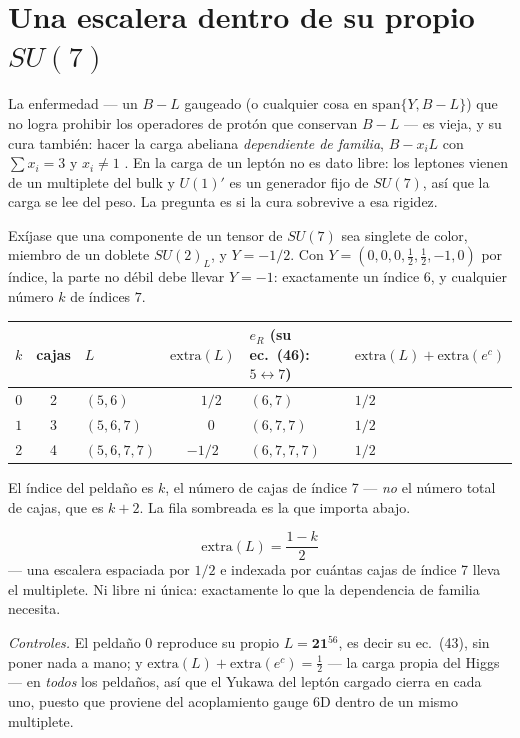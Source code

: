 \documentclass[11pt,a4paper]{article}
\newcommand{\su}[1]{SU(#1)}
\newcommand{\rep}[1]{\mathbf{#1}}
\newenvironment{keyeq}
  {\begin{center}\setlength{\fboxsep}{9pt}\setlength{\fboxrule}{0.8pt}%
   \begin{lrbox}{\keyeqbox}\begin{minipage}{0.88\textwidth}}
  {\end{minipage}\end{lrbox}%
   \fcolorbox{hdrblue!55}{hdrblue!6}{\usebox{\keyeqbox}}\end{center}}
\begin{document}
\section{Una escalera dentro de su propio $\su7$}\label{sec:ladder}

La enfermedad --- un $B-L$ gaugeado (o cualquier cosa en $\mathrm{span}\{Y,B-L\}$) que no logra
prohibir los operadores de protón que conservan $B-L$ --- es vieja, y su cura también: hacer la carga
abeliana \emph{dependiente de familia}, $B-x_iL$ con $\sum x_i=3$ y $x_i\neq1$ \cite{FamilyU1}. En
\cite{KM25} la carga de un leptón no es dato libre: los leptones vienen de un multiplete del bulk y
$U(1)'$ es un generador fijo de $\su7$, así que la carga se lee del peso. La pregunta es si la cura
sobrevive a esa rigidez.

Exíjase que una componente de un tensor de $\su7$ sea singlete de color, miembro de un doblete
$\su2_L$, y $Y=-1/2$. Con $Y=(0,0,0,\tfrac12,\tfrac12,-1,0)$ por índice, la parte no débil debe
llevar $Y=-1$: exactamente un índice $6$, y cualquier número $k$ de índices $7$.

\begin{center}\small
\begin{tabular}{cclcll}
\toprule
\rowcolor{hdrblue!12}
$k$ & cajas & $L$ & $\mathrm{extra}(L)$ & $e_R$ (su ec.~(46): $5\leftrightarrow7$) &
$\mathrm{extra}(L)+\mathrm{extra}(e^c)$\\
\midrule
$0$ & 2 & $(5,6)$ & $\phantom{-}1/2$ & $(6,7)$ & $1/2$\\
\rowcolor{amber!14}
$1$ & 3 & $(5,6,7)$ & $\phantom{-}0$ & $(6,7,7)$ & $1/2$\\
$2$ & 4 & $(5,6,7,7)$ & $-1/2$ & $(6,7,7,7)$ & $1/2$\\
\bottomrule
\end{tabular}
\end{center}

\noindent
El índice del peldaño es $k$, el número de cajas de índice 7 --- \emph{no} el número total de cajas,
que es $k+2$. La fila sombreada es la que importa abajo.

\begin{keyeq}
\[
\mathrm{extra}(L)=\frac{1-k}{2}
\]
--- una escalera espaciada por $1/2$ e indexada por cuántas cajas de índice 7 lleva el multiplete. Ni
libre ni única: exactamente lo que la dependencia de familia necesita.
\end{keyeq}

\emph{Controles.} El peldaño 0 reproduce su propio $L=\rep{21}^{56}$, es decir su ec.~(43), sin poner
nada a mano; y $\mathrm{extra}(L)+\mathrm{extra}(e^c)=\tfrac12$ --- la carga propia del Higgs --- en
\emph{todos} los peldaños, así que el Yukawa del leptón cargado cierra en cada uno, puesto que
proviene del acoplamiento gauge 6D dentro de un mismo multiplete.
\end{document}
